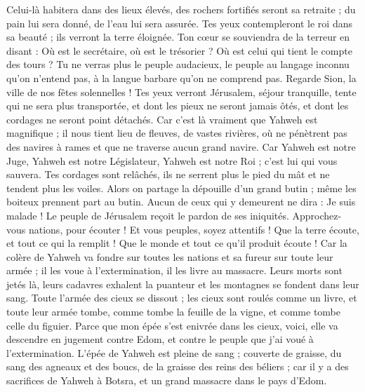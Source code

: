 \begin{multicols}{2}
Celui-là habitera dans des lieux élevés, des rochers fortifiés seront sa retraite ; du pain lui sera donné, de l'eau lui sera assurée.
Tes yeux contempleront le roi dans sa beauté ; ils verront la terre éloignée.
Ton cœur se souviendra de la terreur en disant : Où est le secrétaire, où est le trésorier ? Où est celui qui tient le compte des tours ?
Tu ne verras plus le peuple audacieux, le peuple au langage inconnu qu'on n'entend pas, à la langue barbare qu'on ne comprend pas.
Regarde Sion, la ville de nos fêtes solennelles ! Tes yeux verront Jérusalem, séjour tranquille, tente qui ne sera plus transportée, et dont les pieux ne seront jamais ôtés, et dont les cordages ne seront point détachés.
Car c'est là vraiment que Yahweh est magnifique ; il nous tient lieu de fleuves, de vastes rivières, où ne pénètrent pas des navires à rames et que ne traverse aucun grand navire.
Car Yahweh est notre Juge, Yahweh est notre Législateur, Yahweh est notre Roi ; c'est lui qui vous sauvera.
Tes cordages sont relâchés, ils ne serrent plus le pied du mât et ne tendent plus les voiles. Alors on partage la dépouille d'un grand butin ; même les boiteux prennent part au butin.
Aucun de ceux qui y demeurent ne dira : Je suis malade ! Le peuple de Jérusalem reçoit le pardon de ses iniquités.
\VerseOne{}Approchez-vous nations, pour écouter ! Et vous peuples, soyez attentifs ! Que la terre écoute, et tout ce qui la remplit ! Que le monde et tout ce qu'il produit écoute !
Car la colère de Yahweh va fondre sur toutes les nations et sa fureur sur toute leur armée ; il les voue à l'extermination, il les livre au massacre.
Leurs morts sont jetés là, leurs cadavres exhalent la puanteur et les montagnes se fondent dans leur sang.
Toute l'armée des cieux se dissout ; les cieux sont roulés comme un livre, et toute leur armée tombe, comme tombe la feuille de la vigne, et comme tombe celle du figuier.
Parce que mon épée s'est enivrée dans les cieux, voici, elle va descendre en jugement contre Edom, et contre le peuple que j'ai voué à l'extermination.
L'épée de Yahweh est pleine de sang ; couverte de graisse, du sang des agneaux et des boucs, de la graisse des reins des béliers ; car il y a des sacrifices de Yahweh à Botsra, et un grand massacre dans le pays d'Edom.

\end{multicols}
